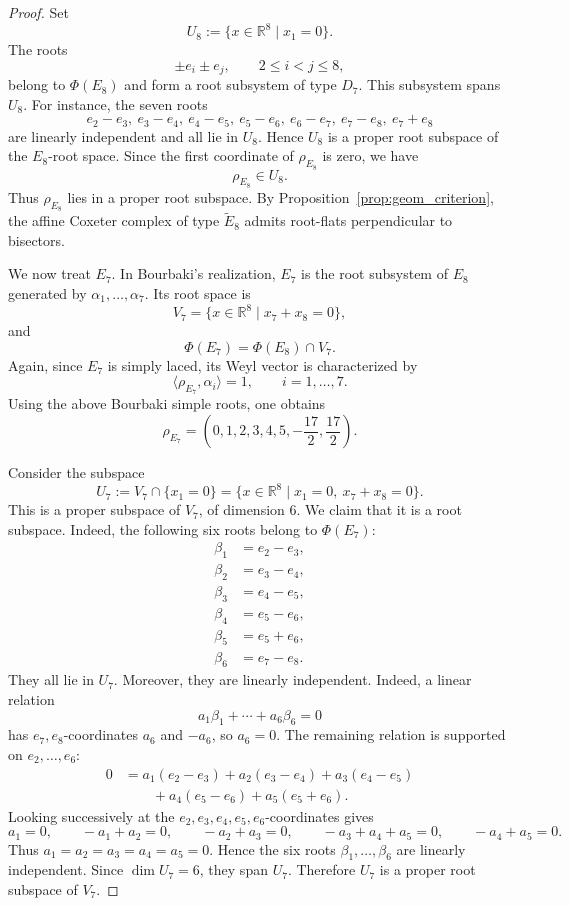 \documentclass[10pt,a4paper]{amsart}
\begin{document}
\begin{proof}
		Set
		\[
		U_8:=\{x\in\mathbb R^8\mid x_1=0\}.
		\]
		The roots
		\[
		\pm e_i\pm e_j,
		\qquad 2\le i<j\le 8,
		\]
		belong to \(\Phi(E_8)\) and form a root subsystem of type \(D_7\). This
		subsystem spans \(U_8\). For instance, the seven roots
		\[
		e_2-e_3,\ e_3-e_4,\ e_4-e_5,\ e_5-e_6,\ e_6-e_7,\ e_7-e_8,\ e_7+e_8
		\]
		are linearly independent and all lie in \(U_8\). Hence \(U_8\) is a proper
		root subspace of the \(E_8\)-root space. Since the first coordinate of
		\(\rho_{E_8}\) is zero, we have
		\[
		\rho_{E_8}\in U_8.
		\]
		Thus \(\rho_{E_8}\) lies in a proper root subspace. By
		Proposition~\ref{prop:geom_criterion}, the affine Coxeter complex of type
		\(\widetilde E_8\) admits root-flats perpendicular to bisectors.
		
		
		We now treat \(E_7\). In Bourbaki's realization, \(E_7\) is the root
		subsystem of \(E_8\) generated by \(\alpha_1,\ldots,\alpha_7\). Its root
		space is
		\[
		V_7
		=
		\{x\in\mathbb R^8\mid x_7+x_8=0\},
		\]
		and
		\[
		\Phi(E_7)=\Phi(E_8)\cap V_7.
		\]
		Again, since \(E_7\) is simply laced, its Weyl vector is characterized by
		\[
		\langle \rho_{E_7},\alpha_i\rangle=1,
		\qquad i=1,\ldots,7.
		\]
		Using the above Bourbaki simple roots, one obtains
		\[
		\rho_{E_7}
		=
		\left(0,1,2,3,4,5,-\frac{17}{2},\frac{17}{2}\right).
		\]
		
		Consider the subspace
		\[
		U_7
		:=
		V_7\cap\{x_1=0\}
		=
		\{x\in\mathbb R^8\mid x_1=0,\ x_7+x_8=0\}.
		\]
		This is a proper subspace of \(V_7\), of dimension \(6\). We claim that it is
		a root subspace. Indeed, the following six roots belong to \(\Phi(E_7)\):
		\[
		\begin{aligned}
			\beta_1&=e_2-e_3,\\
			\beta_2&=e_3-e_4,\\
			\beta_3&=e_4-e_5,\\
			\beta_4&=e_5-e_6,\\
			\beta_5&=e_5+e_6,\\
			\beta_6&=e_7-e_8.
		\end{aligned}
		\]
		They all lie in \(U_7\). Moreover, they are linearly independent. Indeed, a
		linear relation
		\[
		a_1\beta_1+\cdots+a_6\beta_6=0
		\]
		has \(e_7,e_8\)-coordinates \(a_6\) and \(-a_6\), so \(a_6=0\). The remaining
		relation is supported on \(e_2,\ldots,e_6\):
		\[
		\begin{aligned}
			0
			&=
			a_1(e_2-e_3)
			+a_2(e_3-e_4)
			+a_3(e_4-e_5)  \\
			&\qquad
			+a_4(e_5-e_6)
			+a_5(e_5+e_6).
		\end{aligned}
		\]
		Looking successively at the \(e_2,e_3,e_4,e_5,e_6\)-coordinates gives
		\[
		a_1=0,\qquad
		-a_1+a_2=0,\qquad
		-a_2+a_3=0,\qquad
		-a_3+a_4+a_5=0,\qquad
		-a_4+a_5=0.
		\]
		Thus \(a_1=a_2=a_3=a_4=a_5=0\). Hence the six roots
		\(\beta_1,\ldots,\beta_6\) are linearly independent. Since
		\(\dim U_7=6\), they span \(U_7\). Therefore \(U_7\) is a proper root subspace
		of \(V_7\).
		

\end{proof}
\end{document}
